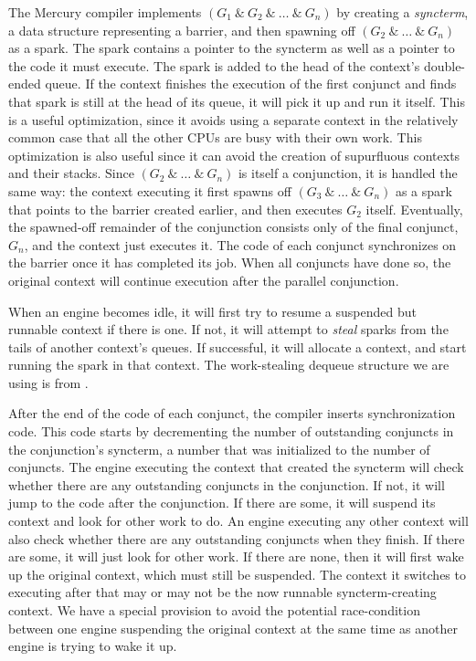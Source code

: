 The Mercury compiler implements $(G_1~\&~G_2~\&~\ldots~\&~G_n)$
by creating a \emph{syncterm}, a data structure representing a barrier,
and then spawning off $(G_2~\&~\ldots~\&~G_n)$ as a spark.
The spark contains a pointer to the syncterm as well as a pointer 
to the code it must execute.
The spark is added to the head of the context's double-ended queue.
If the context finishes the execution of the first conjunct
and finds that spark is still at the head of its queue,
it will pick it up and run it itself.
This is a useful optimization,
since it avoids using a separate context in the relatively common case
that all the other CPUs are busy with their own work.
This optimization is also useful since it can avoid the creation of supurfluous
contexts and their stacks.
Since $(G_2~\&~\ldots~\&~G_n)$ is itself a conjunction,
it is handled the same way:
the context executing it
first spawns off $(G_3~\&~\ldots~\&~G_n)$ as a spark that points to the barrier
created earlier,
and then executes $G_2$ itself.
Eventually, the spawned-off remainder of the conjunction
consists only of the final conjunct, $G_n$,
and the context just executes it.
The code of each conjunct synchronizes on the barrier once it has
completed its job.
When all conjuncts have done so,
the original context will continue execution after the parallel conjunction.

When an engine becomes idle, it will first try
to resume a suspended but runnable context if there is one.
If not, it will attempt to \emph{steal} sparks
from the tails of another context's queues.
If successful, it will allocate a context,
and start running the spark in that context.
The work-stealing dequeue structure we are using
is from \cite{Chase_2005_wsdeque}.

After the end of the code of each conjunct,
the compiler inserts synchronization code.
This code starts by decrementing the number of outstanding conjuncts
in the conjunction's syncterm,
a number that was initialized to the number of conjuncts.
The engine executing the context that created the syncterm
will check whether there are any outstanding conjuncts in the conjunction.
If not, it will jump to the code after the conjunction.
If there are some,
it will suspend its context and look for other work to do.
An engine executing any other context will also check
whether there are any outstanding conjuncts when they finish.
If there are some, it will just look for other work.
If there are none, then it will first wake up the original context,
which must still be suspended.
The context it switches to executing after that
may or may not be the now runnable syncterm-creating context.
We have a special provision to avoid the potential race-condition
between one engine suspending the original context
at the same time as another engine is trying to wake it up.

